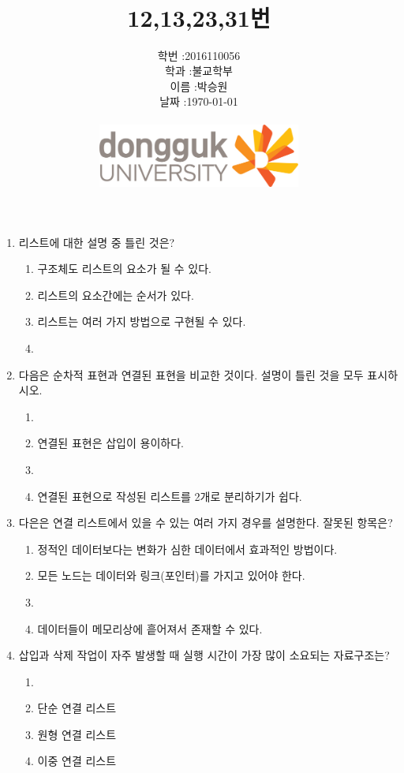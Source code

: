 \documentclass[11pt,a4paper]{article}
\title{
	\centering
	\pgfornament[width=12cm,color=teal]{84}\\
	\vspace{1cm}
	\fontsize{50}{50} \selectfont {자료구조와 실습\\4장 리스트 연습문제}\\12,13,23,31번
		\pgfornament[width=12cm,color=teal]{88}\\
	\vfill}
\author{
	\LARGE
	\begin{tabular}{rl}
		\hline
		학번 : & 2016110056\\ 
		학과 : & 불교학부 \\
		이름 : & 박승원\\
		날짜 : & \today\\
		\hline
	\end{tabular}\vspace{2cm}
	\\
\includegraphics[width=0.5\textwidth]{logo.jpg}
	}
\date{}
\begin{document}
\maketitle


\newpage


\noindent
\begin{enumerate}
	

\item 리스트에 대한 설명 중 틀린 것은?
\begin{enumerate}

	\item 구조체도 리스트의 요소가 될 수 있다.
	\item 리스트의 요소간에는 순서가 있다.
	\item 리스트는 여러 가지 방법으로 구현될 수 있다.
	\item {}
\end{enumerate}

\item 다음은 순차적 표현과 연결된 표현을 비교한 것이다. 설명이 틀린 것을 모두 표시하시오.
	\begin{enumerate}
	\item {}
	\item 연결된 표현은 삽입이 용이하다.
	\item {}
	\item 연결된 표현으로 작성된 리스트를 2개로 분리하기가 쉽다.
	\end{enumerate}
	
\item 다은은 연결 리스트에서 있을 수 있는 여러 가지 경우를 설명한다. 잘못된 항목은?
	\begin{enumerate}
		\item 정적인 데이터보다는 변화가 심한 데이터에서 효과적인 방법이다.
		\item 모든 노드는 데이터와 링크(포인터)를 가지고 있어야 한다.
		\item {}
		\item 데이터들이 메모리상에 흩어져서 존재할 수 있다.
	\end{enumerate}

\item 삽입과 삭제 작업이 자주 발생할 때 실행 시간이 가장 많이 소요되는 자료구조는?
	\begin{enumerate}
		\item {}
		\item 단순 연결 리스트
		\item 원형 연결 리스트
		\item 이중 연결 리스트
	\end{enumerate}


\end{enumerate}
\end{document}
